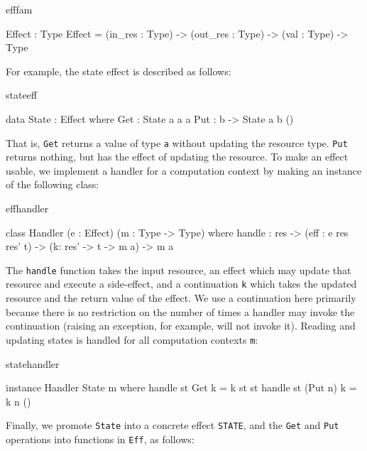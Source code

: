 \begin{SaveVerbatim}{efffam}

Effect : Type
Effect = (in_res : Type) -> (out_res : Type) -> 
         (val : Type) -> Type

\end{SaveVerbatim}

\noindent
For example, the state effect is described as follows:

\begin{SaveVerbatim}{stateeff}

data State : Effect where
     Get :      State a a a
     Put : b -> State a b ()

\end{SaveVerbatim}

\noindent
That is, \texttt{Get} returns a value of type \texttt{a} without updating
the resource type. \texttt{Put} returns nothing, but has the effect of updating
the resource. To make an effect usable, we implement a handler
for a computation context by making an instance of the following class:

\begin{SaveVerbatim}{effhandler}

class Handler (e : Effect) (m : Type -> Type) where
     handle : res -> (eff : e res res' t) -> 
              (k: res' -> t -> m a) -> m a

\end{SaveVerbatim}

\noindent
The \texttt{handle} function takes the input resource, an effect which may
update that resource and execute a side-effect, and a continuation \texttt{k}
which takes the updated resource and the return value of the effect. We use
a continuation here primarily because there is no restriction on the number of
times a handler may invoke the continuation (raising an exception, for example,
will not invoke it). Reading and updating states is handled
for all computation contexts \texttt{m}:

\begin{SaveVerbatim}{statehandler}

instance Handler State m where
     handle st Get     k = k st st
     handle st (Put n) k = k n ()

\end{SaveVerbatim}

\noindent
Finally, we promote \texttt{State} into a concrete effect \texttt{STATE}, and
the \texttt{Get} and \texttt{Put} operations into functions in \texttt{Eff}, as
follows:

